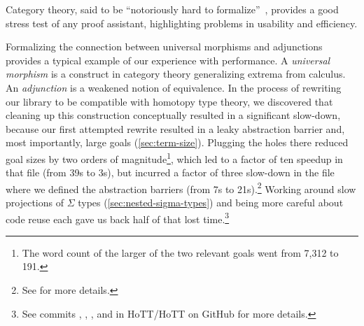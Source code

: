 Category theory, said to be ``notoriously hard to formalize''~\cite{harrison1996formalized}, provides a good stress test of any proof assistant, highlighting problems in usability and efficiency.

Formalizing the connection between universal morphisms and adjunctions provides a typical example of our experience with performance.
A \emph{universal morphism} is a construct in category theory generalizing extrema from calculus.
An \emph{adjunction} is a weakened notion of equivalence.
In the process of rewriting our library to be compatible with homotopy type theory, we discovered that cleaning up this construction conceptually resulted in a significant slow-down, because our first attempted rewrite resulted in a leaky abstraction barrier and, most importantly, large goals (\autoref{sec:term-size}).
Plugging the holes there reduced goal sizes by two orders of magnitude\footnote{The word count of the larger of the two relevant goals went from 7,312 to 191.}, which led to a factor of ten speedup in that file (from 39s to 3s), but incurred a factor of three slow-down in the file where we defined the abstraction barriers (from 7s to 21s).\footnote{%
  See  for more details.%
}
Working around slow projections of $\Sigma$ types (\autoref{sec:nested-sigma-types}) and being more careful about code reuse each gave us back half of that lost time.\footnote{%
  See commits , , , and  in HoTT/HoTT on GitHub for more details.%
}


